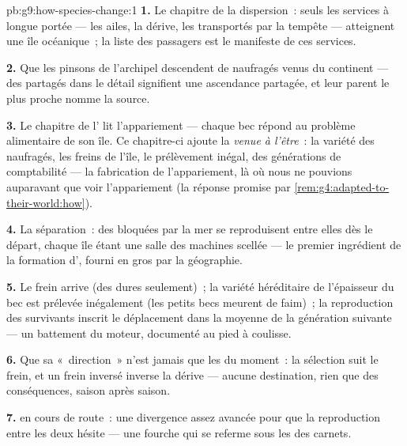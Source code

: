 \begin{solution}{pb:g9:how-species-change:1}
\textbf{1.} Le chapitre de la dispersion~: seuls les
services à longue portée --- les ailes, la dérive, les
transportés par la tempête --- atteignent une île
océanique~; la liste des passagers est le manifeste de ces
services.

\textbf{2.} Que les pinsons de l'archipel descendent de
naufragés venus du continent --- des  partagés dans
le détail signifient une ascendance partagée, et leur parent
le plus proche nomme la  source.

\textbf{3.} Le chapitre de l' lit l'appariement
--- chaque bec répond au problème alimentaire de son île. Ce
chapitre-ci ajoute la \emph{venue à l'être}~: la variété des
naufragés, les freins de l'île, le prélèvement inégal, des
générations de comptabilité --- la fabrication de
l'appariement, là où nous ne pouvions auparavant que voir
l'appariement (la réponse promise par
\cref{rem:g4:adapted-to-their-world:how}).

\textbf{4.} La séparation~: des  bloquées par la
mer se reproduisent entre elles dès le départ, chaque île
étant une salle des machines scellée --- le premier
ingrédient de la formation d', fourni en gros par la
géographie.

\textbf{5.} Le frein arrive (des  dures seulement)~;
la variété héréditaire de l'épaisseur du bec est prélevée
inégalement (les petits becs meurent de faim)~; la
reproduction des survivants inscrit le déplacement dans la
moyenne de la génération suivante --- un battement du
moteur, documenté au pied à coulisse.

\textbf{6.} Que sa «~direction~» n'est jamais que les
 du moment~: la sélection suit le frein, et un
frein inversé inverse la dérive --- aucune destination, rien
que des conséquences, saison après saison.

\textbf{7.}  en
cours de route~: une divergence assez avancée pour que la
reproduction entre les deux hésite --- une fourche qui se
referme sous les  des carnets.


\end{solution}
